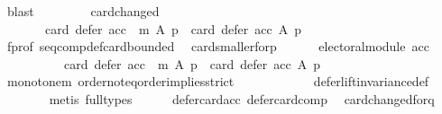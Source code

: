 \begin{isabellebody}
\ blast\isanewline
\ \ \isamarkupfalse%
\isanewline
\ \ \ \ \isamarkupfalse%
\ card{\isacharunderscore}{\kern0pt}changed{\isacharcolon}{\kern0pt}\isanewline
\ \ \ \ \ \ {\isachardoublequoteopen}{\isasymnot}\ {\isacharparenleft}{\kern0pt}card\ {\isacharparenleft}{\kern0pt}defer\ {\isacharparenleft}{\kern0pt}acc\ {\isasymtriangleright}\ m{\isacharparenright}{\kern0pt}\ A\ p{\isacharparenright}{\kern0pt}\ {\isacharequal}{\kern0pt}\ card\ {\isacharparenleft}{\kern0pt}defer\ acc\ A\ p{\isacharparenright}{\kern0pt}{\isacharparenright}{\kern0pt}{\isachardoublequoteclose}\isanewline
\ \ \ \ \isamarkupfalse%
\ f{\isacharunderscore}{\kern0pt}prof\ seq{\isacharunderscore}{\kern0pt}comp{\isacharunderscore}{\kern0pt}def{\isacharunderscore}{\kern0pt}card{\isacharunderscore}{\kern0pt}bounded\ \isamarkupfalse%
\ card{\isacharunderscore}{\kern0pt}smaller{\isacharunderscore}{\kern0pt}for{\isacharunderscore}{\kern0pt}p{\isacharcolon}{\kern0pt}\isanewline
\ \ \ \ \ \ {\isachardoublequoteopen}electoral{\isacharunderscore}{\kern0pt}module\ {\isacharparenleft}{\kern0pt}acc{\isacharparenright}{\kern0pt}\ {\isasymlongrightarrow}\isanewline
\ \ \ \ \ \ \ \ \ \ {\isacharparenleft}{\kern0pt}card\ {\isacharparenleft}{\kern0pt}defer\ {\isacharparenleft}{\kern0pt}acc\ {\isasymtriangleright}\ m{\isacharparenright}{\kern0pt}\ A\ p{\isacharparenright}{\kern0pt}\ {\isacharless}{\kern0pt}\ card\ {\isacharparenleft}{\kern0pt}defer\ acc\ A\ p{\isacharparenright}{\kern0pt}{\isacharparenright}{\kern0pt}{\isachardoublequoteclose}\isanewline
\ \ \ \ \ \ \isamarkupfalse%
\ monotone{\isacharunderscore}{\kern0pt}m\ order{\isachardot}{\kern0pt}not{\isacharunderscore}{\kern0pt}eq{\isacharunderscore}{\kern0pt}order{\isacharunderscore}{\kern0pt}implies{\isacharunderscore}{\kern0pt}strict\isanewline
\ \ \ \ \ \ \ \ \ \ \ \ defer{\isacharunderscore}{\kern0pt}lift{\isacharunderscore}{\kern0pt}invariance{\isacharunderscore}{\kern0pt}def\isanewline
\ \ \ \ \ \ \isamarkupfalse%
\ {\isacharparenleft}{\kern0pt}metis\ {\isacharparenleft}{\kern0pt}full{\isacharunderscore}{\kern0pt}types{\isacharparenright}{\kern0pt}{\isacharparenright}{\kern0pt}\isanewline
\ \ \ \ \isamarkupfalse%
\ defer{\isacharunderscore}{\kern0pt}card{\isacharunderscore}{\kern0pt}acc{\isacharunderscore}{\kern0pt}{}\ defer{\isacharunderscore}{\kern0pt}card{\isacharunderscore}{\kern0pt}comp\ \isamarkupfalse%
\ card{\isacharunderscore}{\kern0pt}changed{\isacharunderscore}{\kern0pt}for{\isacharunderscore}{\kern0pt}q{\isacharcolon}{\kern0pt}\isanewline

\end{isabellebody}
